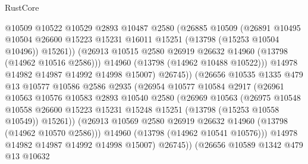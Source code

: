 \begin{lexlean}{RustCore}
\begin{coremodule}
                          @10509
                          @10522
                          @10529
                          @2893
                          @10487
                          @2580
                          (@26885
                            @10509
                            (@26891
                              @10495
                              @10504
                              @26600
                              @15223
                              @15231
                              @16011
                              @15251
                              (@13798 (@15253 @10504 @10496))
                              @15261))
                          (@26913 @10515 @2580 @26919 @26632 @14960 (@13798 (@14962 @10516 @2586)))
                          @14960
                          (@13798 (@14962 @10488 @10522)))
                        @14978
                        @14982
                        @14987
                        @14992
                        @14998
                        @15007)
                      @26745))
                  (@26656
                    @10535
                    @1335
                    @479
                    @13
                    @10577
                    @10586
                    @2586
                    @2935
                    (@26954
                      @10577
                      @10584
                      @2917
                      (@26961
                        @10563
                        @10576
                        @10583
                        @2893
                        @10540
                        @2580
                        (@26969
                          @10563
                          (@26975
                            @10548
                            @10558
                            @26600
                            @15223
                            @15231
                            @15248
                            @15251
                            (@13798 (@15253 @10558 @10549))
                            @15261))
                        (@26913 @10569 @2580 @26919 @26632 @14960 (@13798 (@14962 @10570 @2586)))
                        @14960
                        (@13798 (@14962 @10541 @10576)))
                      @14978
                      @14982
                      @14987
                      @14992
                      @14998
                      @15007)
                    @26745))
                (@26656
                  @10589
                  @1342
                  @479
                  @13
                  @10632

\end{coremodule}
\end{lexlean}
